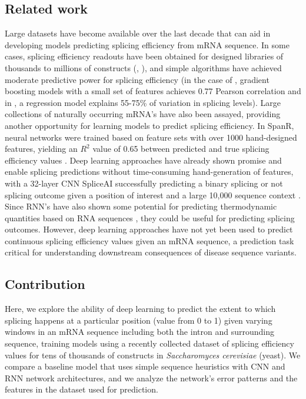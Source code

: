\documentclass{article}
\begin{document}
\subsection{Related work}
Large datasets have become available over the last decade that can aid in developing models predicting splicing efficiency from mRNA sequence. In some cases, splicing efficiency readouts have been obtained for designed libraries of thousands to millions of constructs (\cite{pilpel}, \cite{seelig}), and simple algorithms have achieved moderate predictive power for splicing efficiency (in the case of \cite{pilpel}, gradient boosting models with a small set of features achieves 0.77 Pearson correlation and in \cite{seelig}, a regression model explains 55-75\% of variation in splicing levels). Large collections of naturally occurring mRNA's have also been assayed, providing another opportunity for learning models to predict splicing efficiency. In SpanR, neural networks were trained based on feature sets with over 1000 hand-designed features, yielding an $R^2$ value of 0.65 between predicted and true splicing efficiency values \cite{spanr}. Deep learning approaches have already shown promise and enable splicing predictions without time-consuming hand-generation of features, with a 32-layer CNN SpliceAI successfully predicting a binary splicing or not splicing outcome given a position of interest and a large 10,000 sequence context \cite{spliceai}. Since RNN's have also shown some potential for predicting thermodynamic quantities based on RNA sequences \cite{rnn}, they could be useful for predicting splicing outcomes. However, deep learning approaches have not yet been used to predict continuous splicing efficiency values given an mRNA sequence, a prediction task critical for understanding downstream consequences of disease sequence variants.
\subsection{Contribution}
Here, we explore the ability of deep learning to predict the extent to which splicing happens at a particular position (value from 0 to 1) given varying windows in an mRNA sequence including both the intron and surrounding sequence, training models using a recently collected dataset of splicing efficiency values for tens of thousands of constructs in {\it Saccharomyces cerevisiae} (yeast). We compare a baseline model that uses simple sequence heuristics with CNN and RNN network architectures, and we analyze the network's error patterns and the features in the dataset used for prediction.
\end{document}
